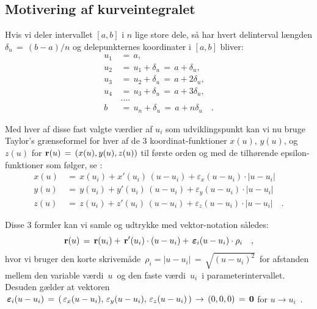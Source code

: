 
\subsection{Motivering af kurveintegralet} \label{subsecMotivKurve}
Hvis vi deler intervallet $[a, b]$ i $n$
lige store dele, så har hvert delinterval længden $\delta_{u} \, =
\, (b-a)/n$ og delepunkternes koordinater i $[a, b]$ bliver:
\begin{equation}
\begin{aligned}
u_{1} \, &= \, a , \\ u_{2} \, &= \, u_{1} + \delta_{u} \, = \, a
+
\delta_{u}, \\
u_{3} \, &= \, u_{2} + \delta_{u} \, = \, a + 2\delta_{u}, \\
u_{4} \, &=
\, u_{3} + \delta_{u} \, = \, a + 3\delta_{u}, \\
 &.... \\
 b \, &= \,
u_{n} + \delta_{u} \, = \, a + n\delta_{u} \quad .
\end{aligned}
\end{equation}

Med hver af disse fast valgte værdier af $u_{i}$ som udviklingspunkt
kan vi nu bruge Taylor's grænseformel for hver af de $3$ koordinat-funktioner $x(u)$, $y(u)$, og $z(u)$ for ${\bf
r}(u) \, = \, \left(x(u), y(u), z(u)\right)$ til første orden og med de
tilhørende epsilon-funktioner som følger, se :
\begin{equation}
\begin{aligned}
x(u) \, &= \, x(u_{i}) + x'(u_{i})\,(u - u_{i}) +
\varepsilon_{x}(u-u_{i})\cdot | u-u_{i} | \\
y(u) \, &= \, y(u_{i}) + y'(u_{i})\,(u - u_{i}) +
\varepsilon_{y}(u-u_{i})\cdot | u-u_{i} | \\
z(u) \, &= \, z(u_{i}) + z'(u_{i})\,(u - u_{i}) +
\varepsilon_{z}(u-u_{i})\cdot | u-u_{i} |  \quad .
\end{aligned}
\end{equation}





Disse $3$ formler  kan vi samle og udtrykke med
vektor-notation således:
\begin{equation} \label{eqTaylor1}
{\bf r}(u) \, = \, {\bf r}(u_{i}) + \, {\bf r}'(u_{i})\cdot(u-u_{i})
+ \, {\bm{\varepsilon}}_{i}(u-u_{i})\cdot\rho_{i} \quad ,
\end{equation}
hvor  vi bruger den korte skrivemåde $\, \rho_{i} =  | u - u_{i} |
\, =\, \sqrt{(u - u_{i})^{2}}\, $ for  afstanden  mellem den
variable værdi $\,u\,$ og den faste værdi $\,u_{i}\,$ i
parameterintervallet. Desuden gælder at vektoren $\,{\bm{\varepsilon}}_{i}(u -
u_{i}) \, = \, (\,\varepsilon_{x}(u-u_{i}),\,
\varepsilon_{y}(u-u_{i}), \, \varepsilon_{z}(u-u_{i})\,)\,  \to \,
(0, 0, 0) \, = \, {\bf{0}}$ for $u \to u_{i}\,$ . \\

